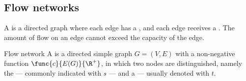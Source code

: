 \documentclass[a4paper, 12pt]{report}
\begin{document}
    \subsection{Flow networks}

    A  is a directed graph where each edge has a , and each edge receives a . The amount of flow on an edge cannot exceed the capacity of the edge.

    \begin{frameddefn}{Flow network}
        A  is a directed simple graph $G = (V, E)$ with a non-negative  function $\func{c}{E(G)}{\R^+}$, in which two nodes are distinguished, namely the  --- commonly indicated with $s$ --- and a  --- usually denoted with $t$.
    \end{frameddefn}
\end{document}
